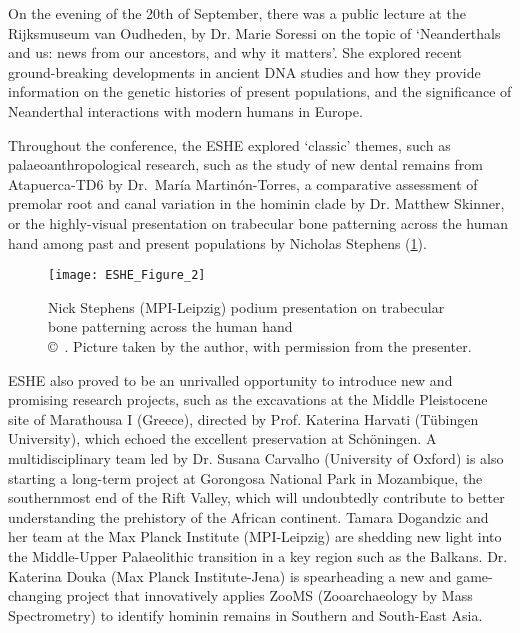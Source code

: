 On the evening of the 20th of September, there was a public lecture at the Rijksmuseum van Oudheden, by Dr. Marie Soressi on the topic of ‘Neanderthals and us: news from our ancestors, and why it matters’. She explored recent ground-breaking developments in ancient DNA studies and how they provide information on the genetic histories of present populations, and the significance of Neanderthal interactions with modern humans in Europe.

Throughout the conference, the ESHE explored ‘classic’ themes, such as palaeoanthropological research, such as the study of new dental remains from Atapuerca-TD6 by Dr.~María Martinón-Torres, a comparative assessment of premolar root and canal variation in the hominin clade by Dr. Matthew Skinner, or the highly-visual presentation on trabecular bone patterning across the human hand among past and present populations by Nicholas Stephens (\cref{fig:ESHE_Figure_2}).

\begin{figure}[!tb]
	\texttt{[image: ESHE\_Figure\_2]}
	\caption{Nick Stephens (MPI-Leipzig) podium presentation on trabecular bone patterning across the human hand
		{\normalfont\scriptsize \\ \copyright\
			\shortauthor. Picture taken by the author, with permission from the presenter.
	}}
	\label{fig:ESHE_Figure_2}
\end{figure}

ESHE also proved to be an unrivalled opportunity to introduce new and promising research projects, such as the excavations at the Middle Pleistocene site of Marathousa I (Greece), directed by Prof. Katerina Harvati (Tübingen University), which echoed the excellent preservation at Schöningen. A multidisciplinary team led by Dr. Susana Carvalho (University of Oxford) is also starting a long-term project at Gorongosa National Park in Mozambique, the southernmost end of the Rift Valley, which will undoubtedly contribute to better understanding the prehistory of the African continent. Tamara Dogandzic and her team at the Max Planck Institute (MPI-Leipzig) are shedding new light into the Middle-Upper Palaeolithic transition in a key region such as the Balkans. Dr. Katerina Douka (Max Planck Institute-Jena) is spearheading a new and game-changing project that innovatively applies ZooMS (Zooarchaeology by Mass Spectrometry) to identify hominin remains in Southern and South-East Asia.

